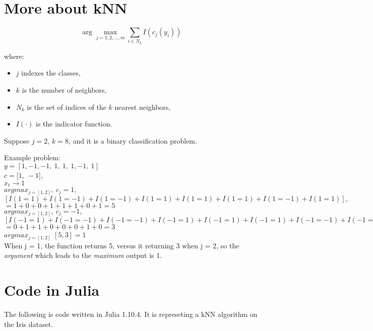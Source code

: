 \section{More about kNN \cite{guo2003knn}}

\begin{equation}
    \arg\max_{j=1,2,\ldots,m} \sum_{i \in N_k} I(c_j(y_i))
\end{equation}

where:
\begin{itemize}
    \item $j$ indexes the classes,
    \item $k$ is the number of neighbors,
    \item $N_k$ is the set of indices of the $k$ nearest neighbors,
    \item $I(\cdot)$ is the indicator function.
\end{itemize}

Suppose $j=2$, $k=8$, and it is a binary classification problem.

Example problem: \\
$y=[1,-1,-1, \ 1, \ 1, \ 1,-1, \ 1]$ \\
$c = [1, \ -1$], \\
$x_t \rightarrow 1$ \\
$argmax_{j=[1,2]}, \ c_j=1, $ \\$[I(1=1)+I(1=-1)+I(1=-1)+I(1=1)+I(1=1)+I(1=1)+I(1=-1)+I(1=1)],$ \\
$= 1+0+0+1+1+1+0+1 = 5$\\
$argmax_{j=[1,2]}, \ c_j=-1, $ \\
$[I(-1=1)+I(-1=-1)+I(-1=-1)+I(-1=1)+I(-1=1)+I(-1=1)+I(-1=-1)+I(-1=1)]$ \\
$= 0+1+1+0+0+0+1+0 = 3$\\
$argmax_{j=[1,2]}$ $[5,3]=1$ \\
When j = 1, the function returns 5, versus it returning 3 when j = 2,
so the \textit{argument} which leads to the \textit{maximum} output is
1.


\section{Code in Julia}
The following is code written in Julia 1.10.4. 
It is represeting a kNN algorithm on the Iris dataset.

